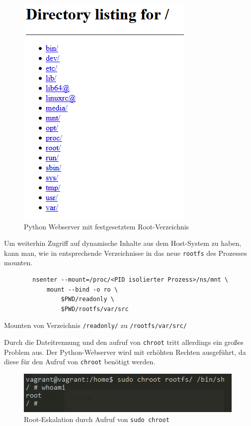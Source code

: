 \begin{figure}[H]
	\begin{center}
		\includegraphics[scale=0.8]{bilder/chroot-python-webserver.png}
		\caption{Python Webserver mit festgesetztem Root-Verzeichnis}
		\label{fig:chrootPythonWebserver}
	\end{center}
\end{figure}

Um weiterhin Zugriff auf dynamische Inhalte aus dem Host-System zu haben, kann man, wie in  entsprechende Verzeichnisse in das neue \texttt{rootfs} des Prozesses mounten.

\begin{listing}[h]
	\begin{verbatim}
		nsenter --mount=/proc/<PID isolierter Prozess>/ns/mnt \
			mount --bind -o ro \
				$PWD/readonly \
				$PWD/rootfs/var/src
	\end{verbatim}
	\caption{Mounten von Verzeichnis \texttt{/readonly/} zu \texttt{/rootfs/var/src/}}
\end{listing}

Durch die Dateitrennung und den aufruf von \texttt{chroot} tritt allerdings ein großes Problem aus. Der Python-Webserver wird mit erhöhten Rechten ausgeführt, da diese für den Aufruf von \texttt{chroot} benötigt werden.

\begin{figure}[h]
	\begin{center}
		\includegraphics[scale=1]{bilder/chroot-whoami-root.png}
		\caption{Root-Eskalation durch Aufruf von \texttt{sudo chroot}}
		\label{fig:chrootWhoami}
	\end{center}
\end{figure}

